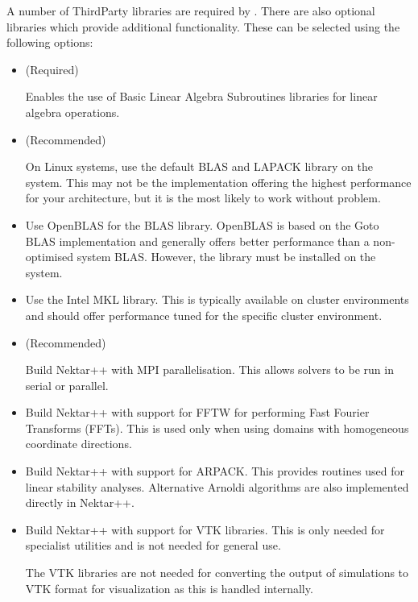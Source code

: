 A number of ThirdParty libraries are required by \nekpp. There are also
optional libraries which provide additional functionality. These can be selected
using the following options:
\begin{itemize}
    \item {} (Required)
    
    Enables the use of Basic Linear Algebra Subroutines libraries for linear
    algebra operations.

    \item {} (Recommended)
    
    On Linux systems, use the default BLAS and LAPACK library on the system.
    This may not be the implementation offering the highest performance for your
    architecture, but it is the most likely to work without problem.
    
    \item {}
    
    Use OpenBLAS for the BLAS library. OpenBLAS is based on the Goto BLAS
    implementation and generally offers better performance than a non-optimised
    system BLAS. However, the library must be installed on the system.
    
    \item {}
    
    Use the Intel MKL library. This is typically available on cluster
    environments and should offer performance tuned for the specific cluster
    environment.
    
    \item {} (Recommended)
    
    Build Nektar++ with MPI parallelisation. This allows solvers to be run in
    serial or parallel.
    
    \item {}
    
    Build Nektar++ with support for FFTW for performing Fast Fourier Transforms
    (FFTs). This is used only when using domains with homogeneous coordinate
    directions.
    
    \item {}
    
    Build Nektar++ with support for ARPACK. This provides routines used for
    linear stability analyses. Alternative Arnoldi algorithms are also
    implemented directly in Nektar++.
    
    \item {}
    
    Build Nektar++ with support for VTK libraries. This is only needed for
    specialist utilities and is not needed for general use.
    
    \begin{notebox}
    The VTK libraries are not needed for converting the output of simulations to
    VTK format for visualization as this is handled internally.
    \end{notebox}
\end{itemize}

